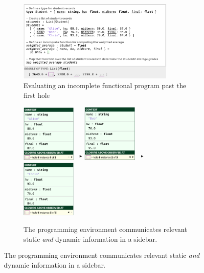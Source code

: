 
\begin{figure}[t]
\begin{subfigure}[t]{\textwidth}
\centering
\includegraphics[width=0.85\textwidth,interpolate=false]{images/grades-cell-mockup.png}
\caption{Evaluating an incomplete functional program past the first hole}
\label{fig:grades-cell-mockup}
\end{subfigure}

\vspace{10px}

\begin{subfigure}[t]{\textwidth}
\centering
\includegraphics[width=0.3\textwidth,interpolate=false]{images/grades-sidebar-1.png}
~${}^\blacktriangleright$
\includegraphics[width=0.3\textwidth,interpolate=false]{images/grades-sidebar-2.png}
~${}^\blacktriangleright$
\includegraphics[width=0.3\textwidth,interpolate=false]{images/grades-sidebar-3.png}
\caption{The programming environment communicates relevant static \emph{and} dynamic information in a sidebar.}
\label{fig:grades-sidebar}
\end{subfigure}


\end{figure}
